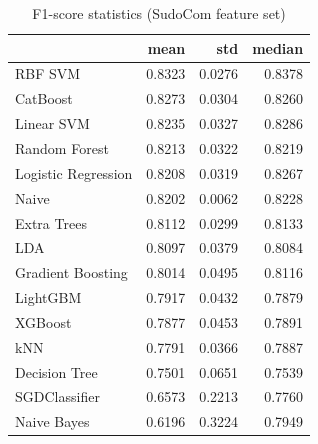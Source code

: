 \begin{table}
\caption{F1-score statistics (SudoCom feature set)}
\label{tab:f1_SudoCom_stats}
\begin{tabular}{lrrr}
\toprule
 & mean & std & median \\
\midrule
RBF SVM & 0.8323 & 0.0276 & 0.8378 \\
CatBoost & 0.8273 & 0.0304 & 0.8260 \\
Linear SVM & 0.8235 & 0.0327 & 0.8286 \\
Random Forest & 0.8213 & 0.0322 & 0.8219 \\
Logistic Regression & 0.8208 & 0.0319 & 0.8267 \\
Naive & 0.8202 & 0.0062 & 0.8228 \\
Extra Trees & 0.8112 & 0.0299 & 0.8133 \\
LDA & 0.8097 & 0.0379 & 0.8084 \\
Gradient Boosting & 0.8014 & 0.0495 & 0.8116 \\
LightGBM & 0.7917 & 0.0432 & 0.7879 \\
XGBoost & 0.7877 & 0.0453 & 0.7891 \\
kNN & 0.7791 & 0.0366 & 0.7887 \\
Decision Tree & 0.7501 & 0.0651 & 0.7539 \\
SGDClassifier & 0.6573 & 0.2213 & 0.7760 \\
Naive Bayes & 0.6196 & 0.3224 & 0.7949 \\
\bottomrule
\end{tabular}
\end{table}
